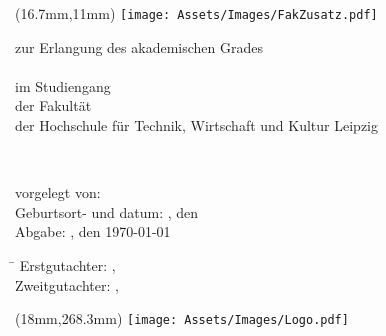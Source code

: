 

\begin{titlepage}
	\noindent
\begin{textblock*}{4.74cm}(16.7mm,11mm)
\texttt{[image: Assets/Images/FakZusatz.pdf]}
\end{textblock*}
\begin{center}

\vspace*{0.5cm}

\large
{\textsc{\Large \abschlussarbeit}}

\vspace*{0.5cm}
zur Erlangung des akademischen Grades\\[0.6cm]
\studienganggrad\\[0.6cm]
im Studiengang \studiengang\\
der Fakultät \\
der Hochschule für Technik, Wirtschaft und Kultur Leipzig

\vspace*{0.8cm}
{\LARGE \textbf{\titel}}\\
\vspace*{0.5cm}
{\Large \textbf{\subtitel}}

\end{center}


\vspace*{1.3cm}
vorgelegt von: \autor \\
Geburtsort- und datum: \geburtsort, den \geburtstag \\
Abgabe: \ort, den \today



\vspace*{1cm}
\large
\begin{tabbing}
\hspace{4cm}\=\kill
Erstgutachter:  \> \erstgutachter, \instituteErstgutachter\\ 
Zweitgutachter: \> \zweitgutachter, \instituteZweitgutachter
\end{tabbing} 

\begin{textblock*}{8.41cm}(18mm,268.3mm)
\texttt{[image: Assets/Images/Logo.pdf]}
\end{textblock*}

\end{titlepage}
